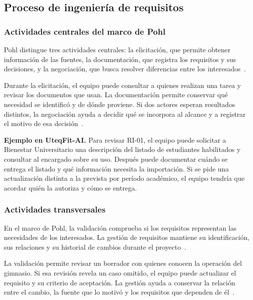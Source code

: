 \subsection{Proceso de ingeniería de requisitos}

\subsubsection{Actividades centrales del marco de Pohl}

Pohl distingue tres actividades centrales: la elicitación, que permite
obtener información de las fuentes, la documentación, que registra
los requisitos y sus decisiones, y la negociación, que busca resolver
diferencias entre los interesados~\cite{pohl2025}.

Durante la elicitación, el equipo puede consultar a quienes realizan
una tarea y revisar los documentos que usan. La documentación
permite conservar qué necesidad se identificó y de dónde proviene.
Si dos actores esperan resultados distintos, la negociación ayuda
a decidir qué se incorpora al alcance y a registrar el motivo de
esa decisión~\cite{pohl2025,swebok2024}.

\textbf{Ejemplo en UteqFit-AI.}
Para revisar RI-01, el equipo puede solicitar a Bienestar
Universitario una descripción del listado de estudiantes habilitados
y consultar al encargado sobre su uso. Después puede documentar
cuándo se entrega el listado y qué información necesita la
importación. Si se pide una actualización distinta a la prevista
por período académico, el equipo tendría que acordar quién la
autoriza y cómo se entrega.

\subsubsection{Actividades transversales}

En el marco de Pohl, la validación comprueba si los requisitos
representan las necesidades de los interesados. La gestión de
requisitos mantiene su identificación, sus relaciones y su historial
de cambios durante el proyecto~\cite{pohl2025,ieee29148}.

La validación permite revisar un borrador con quienes conocen la
operación del gimnasio. Si esa revisión revela un caso omitido,
el equipo puede actualizar el requisito y su criterio de aceptación.
La gestión ayuda a conservar la relación entre el cambio, la fuente
que lo motivó y los requisitos que dependen de él~\cite{pohl2025,swebok2024}.

